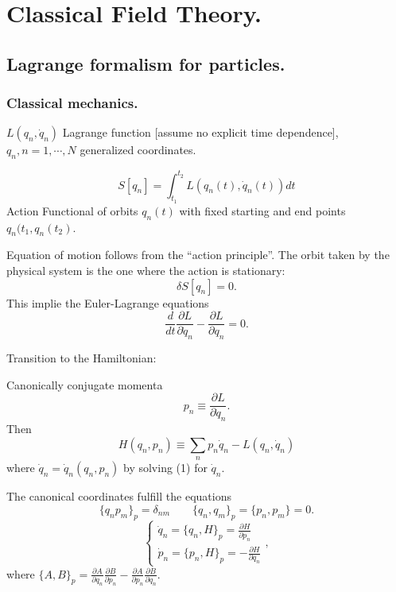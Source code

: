 \english

\def\calL{\mathcal{L}}
\def\bbR{\mathbb{R}}
\def\bbC{\mathbb{C}}

\section{Classical Field Theory.}

\subsection{Lagrange formalism for particles.}

\subsubsection{Classical mechanics.}

\qquad $L(q_n, \dot{q}_n)$ Lagrange function [assume no explicit time dependence], $q_n, n=1,\cdots, N$ generalized coordinates.

    $$S[q_n]= \int_{t_1}^{t_2}L(q_n(t), \dot{q}_n(t)) dt$$
 Action Functional of orbits $q_n(t)$ with fixed starting and end points $q_n(t_1, q_n(t_2)$.

 \qquad Equation of motion follows from the ``action principle''. The orbit taken by the physical system is the one where the action 
is stationary:
            $$\delta S[q_n]=0.$$
This implie the Euler-Lagrange equations
            $$\frac{d}{dt} \frac{\partial L}{\partial \dot{q}_n} - \frac{\partial L}{\partial q_n} = 0.$$

    \qquad Transition to the Hamiltonian:

    \qquad Canonically conjugate momenta 
        \begin{equation}
            p_n \equiv  \frac{\partial L}{\partial \dot{q}_n}.
        \end{equation}
Then
        $$H(q_n, p_n) \equiv \sum\limits_n p_n \dot{q}_n - L(q_n, \dot{q}_n)$$
where $\dot{q}_n =\dot{q}_n(q_n, p_n)$ by solving (1) for $\dot{q}_n$.

    \qquad The canonical coordinates fulfill the equations
        $$\{q_n p_m \}_p = \delta_{nm} \qquad \{q_n, q_m\}_p = \{p_n, p_m \}=0.$$
        $$\begin{cases}
            \dot{q}_n = \{q_n, H\}_p = \frac{\partial H}{\partial p_n}\\
            \dot{p}_n = \{p_n, H\}_p = -\frac{\partial H}{\partial q_n}
        \end{cases},$$
where $\{A, B\}_p = \frac{\partial A}{\partial q_n}\frac{\partial B}{\partial p_n}-\frac{\partial A}{\partial p_n}\frac{\partial B}{\partial q_n}$.

